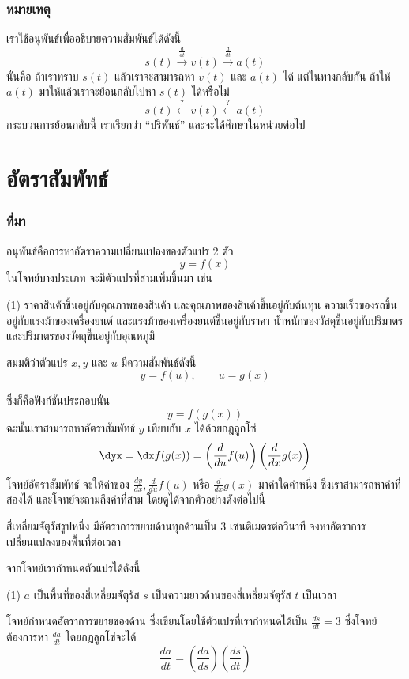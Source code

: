 \begin{frame}
\frametitle{หมายเหตุ}
เราใช้อนุพันธ์เพื่ออธิบายความสัมพันธ์ได้ดังนี้
\[ s(t) \xrightarrow{\frac{d}{dt}} v(t) \xrightarrow{\frac{d}{dt}} a(t)\]
นั่นคือ ถ้าเราทราบ $s(t)$ แล้วเราจะสามารถหา $v(t)$ และ $a(t)$ ได้ แต่ในทางกลับกัน ถ้าให้ $a(t)$ มาให้แล้วเราจะย้อนกลับไปหา $s(t)$ ได้หรือไม่
\[ s(t) \xleftarrow{?} v(t) \xleftarrow{?} a(t)\]
กระบวนการย้อนกลับนี้ เราเรียกว่า ``ปริพันธ์'' และจะได้ศึกษาในหน่วยต่อไป
\end{frame}

\section{อัตราสัมพัทธ์}
\frame{\sectionpage}

\begin{frame}
\frametitle{ที่มา}
อนุพันธ์คือการหาอัตราความเปลี่ยนแปลงของตัวแปร 2 ตัว \pa
\[y = f(x)\]
ในโจทย์บางประเภท จะมีตัวแปรที่สามเพิ่มขึ้นมา เช่น
\begin{tasks}[style=enumerate](1)
\task ราคาสินค้าขึ้นอยู่กับคุณภาพของสินค้า และคุณภาพของสินค้าขึ้นอยู่กับต้นทุน
\task ความเร็วของรถขึ้นอยู่กับแรงม้าของเครื่องยนต์ และแรงม้าของเครื่องยนต์ขึ้นอยู่กับราคา
\task น้ำหนักของวัสดุขึ้นอยู่กับปริมาตร และปริมาตรของวัตถุขึ้นอยู่กับอุณหภูมิ
\end{tasks}
\end{frame}

\begin{frame}[t]
สมมติว่าตัวแปร $x,y$ และ $u$ มีความสัมพันธ์ดังนี้
\[y = f(u), \qquad u = g(x)\]
\begin{slide}
ซึ่งก็คือฟังก์ชันประกอบนั่น
\[y = f(g(x))\]
ฉะนั้นเราสามารถหาอัตราสัมพัทธ์ $y$ เทียบกับ $x$ ได้ด้วยกฎลูกโซ่
\[ \dyx = \dx f(g(x)) = \left( \frac{d}{du} f(u) \right) \left( \frac{d}{dx} g(x) \right)\]
โจทย์อัตราสัมพัทธ์ จะให้ค่าของ $\frac{dy}{dx}, \frac{d}{du} f(u)$ หรือ $\frac{d}{dx} g(x)$ มาค่าใดค่าหนึ่ง ซึ่งเราสามารถหาค่าที่สองได้ และโจทย์จะถามถึงค่าที่สาม โดยดูได้จากตัวอย่างดังต่อไปนี้
\end{slide}
\end{frame}


\begin{frame}[t]
\begin{ex}
สี่เหลี่ยมจัตุรัสรูปหนึ่ง มีอัตราการขยายด้านทุกด้านเป็น 3 เซนติเมตรต่อวินาที จงหาอัตราการเปลี่ยนแปลงของพื้นที่ต่อเวลา
\end{ex}
\begin{sol}
จากโจทย์เรากำหนดตัวแปรได้ดังนี้
\begin{tasks}[style=enumerate](1)
\task $a$ เป็นพื้นที่ของสี่เหลี่ยมจัตุรัส 
\task $s$ เป็นความยาวด้านของสี่เหลี่ยมจัตุรัส
\task $t$ เป็นเวลา
\end{tasks}
โจทย์กำหนดอัตราการขยายของด้าน ซึ่งเขียนโดยใช้ตัวแปรที่เรากำหนดได้เป็น $\frac{ds}{dt} = 3$ ซึ่งโจทย์ต้องการหา $\frac{da}{dt}$ โดยกฎลูกโซ่จะได้
\[ \frac{da}{dt} = \left( \frac{da}{ds} \right) \left( \frac{ds}{dt} \right)\]
\end{sol}
\end{frame}

